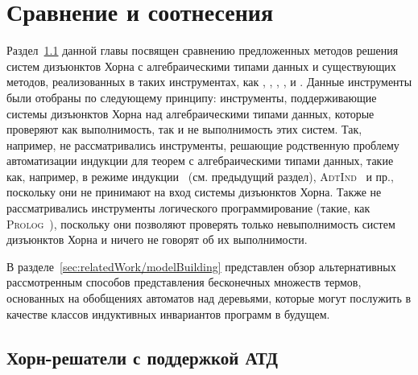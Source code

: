 \chapter{Сравнение и соотнесения}\label{ch:relatedWork}

Раздел~\cref{sec:relatedWork/hornSolvers} данной главы посвящен сравнению предложенных методов решения систем дизъюнктов Хорна с алгебраическими типами данных и существующих методов, реализованных в таких инструментах, как \spacer{}, \racer{}, \eldarica{}, \vericat{}, \hoice{} и \rchc{}. Данные инструменты были отобраны по следующему принципу: инструменты, поддерживающие системы дизъюнктов Хорна над алгебраическими типами данных, которые проверяют как выполнимость, так и не выполнимость этих систем. Так, например, не рассматривались инструменты, решающие родственную проблему автоматизации индукции для теорем с алгебраическими типами данных, такие как, например, \cvc{} в режиме индукции~\cite{reynolds2015induction} (см. предыдущий раздел), \textsc{AdtInd}~\cite{10.1007/978-3-030-30048-7_35} и пр., поскольку они не принимают на вход системы дизъюнктов Хорна. Также не рассматривались инструменты логического программирование (такие, как \textsc{Prolog}~\cite{ClocksinMellish03}), поскольку они позволяют проверять только невыполнимость систем дизъюнктов Хорна и ничего не говорят об их выполнимости.

В разделе~\cref{sec:relatedWork/modelBuilding} представлен обзор альтернативных рассмотренным способов представления бесконечных множеств термов, основанных на обобщениях автоматов над деревьями, которые могут послужить в качестве классов индуктивных инвариантов программ в будущем.

\section{Хорн-решатели с поддержкой АТД}\label{sec:relatedWork/hornSolvers}

